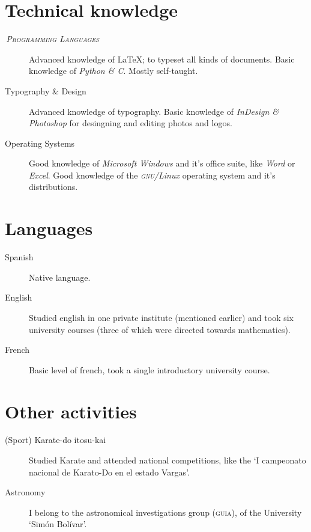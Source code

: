 \documentclass[draft,letterpaper,10pt]{article}
\newcommand{\entryone}[2]{
{\noindent\textsc{#1}}
\begin{quotation}
	\noindent#2.
\end{quotation}
}
\let\oldtextsc=\textsc
\renewcommand{\textsc}[1]{\oldtextsc{\MakeLowercase{#1}}}
\newcommand{\itemtitle}[1]{\,{\itshape\scshape #1}\smallskip}
\begin{document}
\section*{Technical knowledge}
\begin{description}
	\item[\itemtitle{Programming Languages}] Advanced knowledge of \LaTeX; to typeset all kinds of documents. Basic knowledge of \emph{Python \& C}. Mostly self-taught.
	\item[Typography \& Design] Advanced knowledge of typography. Basic knowledge of \emph{InDesign \& Photoshop} for desingning and editing photos and logos.
	\item[Operating Systems]  Good knowledge of \emph{Microsoft Windows} and it's office suite, like \emph{Word} or \emph{Excel}. Good knowledge of the \emph{\textsc{gnu}/Linux} operating system and it's distributions.
\end{description}

\section*{Languages}
\begin{description}
	\item[Spanish] Native language.
	\item[English] Studied english in one private institute (mentioned earlier) and took six university courses (three of which were directed towards mathematics).
	\item[French] Basic level of french, took a single introductory university course.
\end{description}

\section*{Other activities}
\begin{description}
	\item[(Sport) Karate-do itosu-kai]	Studied Karate and attended national competitions, like the `I campeonato nacional de Karato-Do en el estado Vargas'.
	\item[Astronomy] I belong to the astronomical investigations group (\textsc{GUIA}), of the University `Simón Bolívar'.
\end{description}
\end{document}
